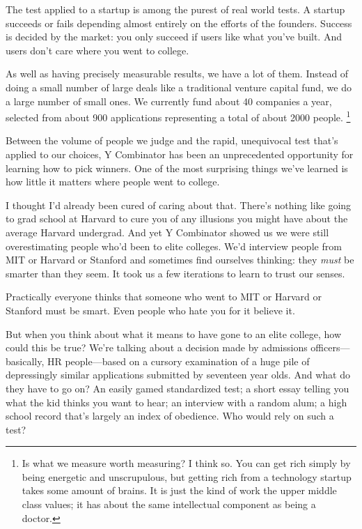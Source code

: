 \documentclass[12pt]{book}
\begin{document}
The test applied to a startup is among the purest of real world tests. A
startup succeeds or fails depending almost entirely on the efforts of
the founders. Success is decided by the market: you only succeed if
users like what you've built. And users don't care where you went to
college.

As well as having precisely measurable results, we have a lot of them.
Instead of doing a small number of large deals like a traditional
venture capital fund, we do a large number of small ones. We currently
fund about 40 companies a year, selected from about 900 applications
representing a total of about 2000 people. \footnote{Is what we measure worth measuring? I think so. You can get rich
simply by being energetic and unscrupulous, but getting rich from a
technology startup takes some amount of brains. It is just the kind of
work the upper middle class values; it has about the same intellectual
component as being a doctor.}

Between the volume of people we judge and the rapid, unequivocal test
that's applied to our choices, Y Combinator has been an unprecedented
opportunity for learning how to pick winners. One of the most surprising
things we've learned is how little it matters where people went to
college.

I thought I'd already been cured of caring about that. There's nothing
like going to grad school at Harvard to cure you of any illusions you
might have about the average Harvard undergrad. And yet Y Combinator
showed us we were still overestimating people who'd been to elite
colleges. We'd interview people from MIT or Harvard or Stanford and
sometimes find ourselves thinking: they \emph{must} be smarter than they
seem. It took us a few iterations to learn to trust our senses.

Practically everyone thinks that someone who went to MIT or Harvard or
Stanford must be smart. Even people who hate you for it believe it.

But when you think about what it means to have gone to an elite college,
how could this be true? We're talking about a decision made by
admissions officers---basically, HR people---based on a cursory
examination of a huge pile of depressingly similar applications
submitted by seventeen year olds. And what do they have to go on? An
easily gamed standardized test; a short essay telling you what the kid
thinks you want to hear; an interview with a random alum; a high school
record that's largely an index of obedience. Who would rely on such a
test?
\end{document}
